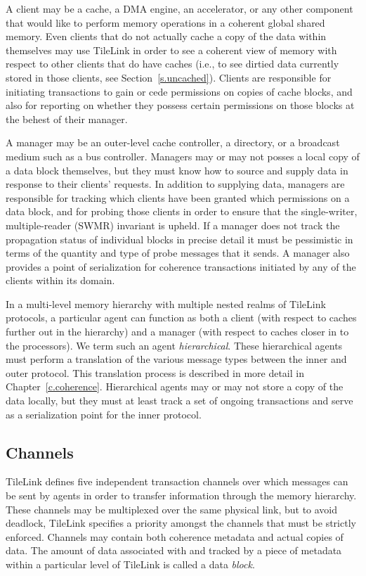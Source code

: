 A client may be a cache, a DMA engine, an accelerator, or any other component that would like to perform memory operations in a coherent global shared memory.
Even clients that do not actually cache a copy of the data within themselves may use TileLink in order to see a coherent view of memory with respect to other clients that do have caches
(i.e., to see dirtied data currently stored in those clients, see Section~\ref{s.uncached}).
Clients are responsible for initiating transactions to gain or cede permissions on copies of cache blocks, and also for reporting on whether they possess certain permissions on those blocks
at the behest of their manager.

A manager may be an outer-level cache controller, a directory, or a broadcast medium such as a bus controller.
Managers may or may not posses a local copy of a data block themselves, but they must know how to source and supply data in response to their clients' requests.
In addition to supplying data, managers are responsible for tracking which clients have been granted which permissions on a data block,
and for probing those clients in order to ensure that the 
single-writer, multiple-reader (SWMR) invariant \cite{sorin2011primer} is upheld.
If a manager does not track the propagation status of individual blocks in precise detail it must be pessimistic
in terms of the quantity and type of probe messages that it sends.
A manager also provides a point of serialization for coherence transactions
initiated by any of the clients within its domain.

In a multi-level memory hierarchy with multiple nested realms of TileLink protocols, a particular agent can function as both
a client (with respect to caches further out in the hierarchy)
and a manager (with respect to caches closer in to the processors).
We term such an agent {\em hierarchical}.
These hierarchical agents must perform a translation of the various message types between the inner and outer protocol.
This translation process is described in more detail in Chapter~\ref{c.coherence}.
Hierarchical agents may or may not store a copy of the data locally, but they must at least track a set of ongoing transactions and serve as a serialization point for the inner protocol.

\subsection{Channels}

TileLink defines five independent transaction channels over which messages can be sent by agents in order to transfer information through the memory hierarchy.
These channels may be multiplexed over the same physical link, but to avoid deadlock, TileLink specifies a priority amongst the channels that must be strictly enforced.
Channels may contain both coherence metadata and actual copies of data.
The amount of data associated with and tracked by a piece of metadata within a particular level of TileLink is called a data {\em block}.

